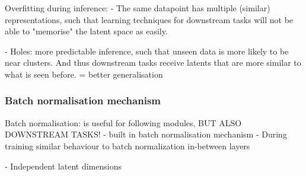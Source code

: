 		Overfitting during inference:
		- The same datapoint has multiple (similar) representations, such that learning techniques for downstream tasks will not be able to "memorise" the latent space as easily.
		
		- Holes: more predictable inference, such that unseen data is more likely to be near clusters. And thus downstream tasks receive latents that are more similar to what is seen before.
		= better generalisation
		

	\subsubsection{Batch normalisation mechanism}
	Batch normalisation: is useful for following modules, BUT ALSO DOWNSTREAM TASKS!
		- built in batch normalisation mechanism
		- During training similar behaviour to batch normalization in-between layers
	
	- Independent latent dimensions
		

	
	
	
	

	


















%


